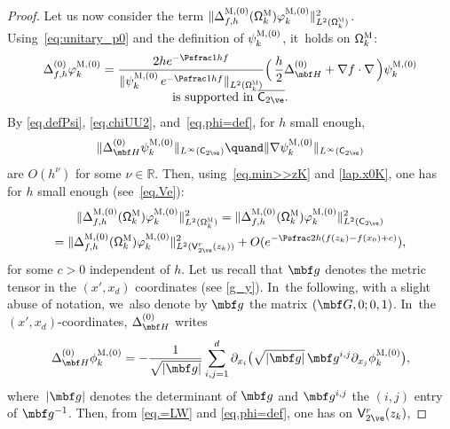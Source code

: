 \begin{proof}
Let us now consider the term $\Vert \Delta_{f,h}^{\textsc{M}, (0)}(\mathsf \Omega_k^{\textsc{M}})\varphi^{\textsc{M},(0)}_k \Vert_{L^2(\mathsf \Omega_k^{\textsc{M}})}^2$. Using~\eqref{eq:unitary_p0} and the definition of $\psi^{\textsc{M},(0)}_k$, it~holds on $\mathsf \Omega_k^{\textsc{M}}$:\vspace*{-3pt}
\begin{multline}
\label{eq.=LW}
\Delta_{f,h}^{(0)}\varphi^{\textsc{M},(0)}_k= \frac{2h e^{-\Psfrac 1hf} }{\Vert \psi^{\textsc{M},(0)}_k\, e^{-\Psfrac 1hf} \Vert_{L^2(\mathsf \Omega_k^{\textsc{M}})}}\Bigl(\, \frac h2 \Delta_{\mbf H}^{(0)}+\nabla f\cdot \nabla \, \Bigr)\psi^{\textsc{M},(0)}_k \\[-5pt] \text{is supported in $\overline{\mathsf C_{2\ve}}$.}
\end{multline}
By \eqref{eq.defPsi}, \eqref{eq.chiUU2}, and~\eqref{eq.phi=def}, for
$h$ small enough,\vspace*{-3pt}
\[
\Vert \Delta_{\mbf H}^{(0)}
\psi^{\textsc{M},(0)}_k\Vert_{L^\infty(\mathsf C_{2\ve})}\quand\Vert \nabla\psi^{\textsc{M},(0)}_k \Vert_{L^\infty(\mathsf C_{2\ve})}
\]
are $O(h^\nu)$ for some $\nu\in \mathbb R$.
Then, using~\eqref{eq.min>>zK} and \eqref{lap.x0K}, one has for $h$ small enough (see~\eqref{eq.Ve}):\vspace*{-3pt}
\begin{multline}
\label{eq.NeG}
\Vert \Delta_{f,h}^{\textsc{M}, (0)}(\mathsf \Omega_k^{\textsc{M}})\varphi^{\textsc{M},(0)}_k \Vert_{L^2(\mathsf \Omega_k^{\textsc{M}})}^2 =\Vert \Delta_{f,h}^{\textsc{M}, (0)}(\mathsf \Omega_k^{\textsc{M}})\varphi^{\textsc{M},(0)}_k \Vert_{L^2(\mathsf C_{2\ve})}^2\\
= \Vert \Delta_{f,h}^{\textsc{M}, (0)}(\mathsf \Omega_k^{\textsc{M}})\varphi^{\textsc{M},(0)}_k\Vert_{L^2(\mathsf V_{2\ve}^r(z_k))}^2 +O(e^{-\Psfrac 2h (f(z_k)-f(x_0)+c)}),
\end{multline}
for some $c>0$ independent of $h$. Let us recall that $\mbf g$ denotes
the metric tensor in the $(x',x_d)$ coordinates (see \eqref{g_y}). In~the following, with a slight abuse of notation, we~also denote by
$\mbf g$ the matrix $(\mbf G, 0;0, 1)$. In~the $(x',x_d)$-coordinates, $\Delta_{\mbf H}^{(0)}$ writes
\[
\Delta_{\mbf H}^{(0)} \phi^{\textsc{M},(0)}_k=-\frac{1}{\sqrt{\vert \mbf g\vert}}\sum_{i,j=1}^d \partial_{x_i}\bigl(\sqrt{\vert \mbf g\vert} \, \mbf g^{i,j} \partial_{x_j}\phi^{\textsc{M},(0)}_k \bigr),
\]
where~$\vert \mbf g\vert$ denotes the determinant of $ \mbf g$ and $\mbf g^{i,j} $ the $(i,j)$ entry of $ \mbf g^{-1}$.
Then, from \eqref{eq.=LW} and \eqref{eq.phi=def}, one has on $\mathsf V_{2\ve}^r(z_k)$,

\end{proof}
